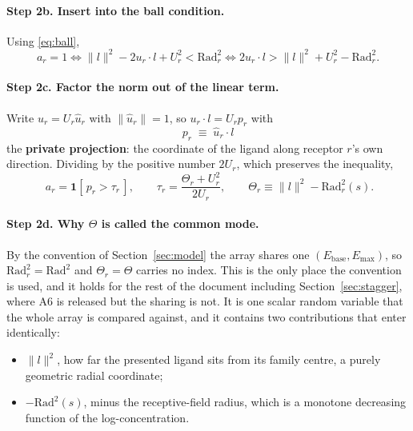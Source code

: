 \documentclass[11pt,a4paper]{article}
\newcommand{\Ebase}{E_{\mathrm{base}}}
\newcommand{\Emax}{E_{\mathrm{max}}}
\newcommand{\uhat}{\hat{u}}
\begin{document}
\paragraph{Step 2b. Insert into the ball condition.} Using \eqref{eq:ball},
\begin{equation}
  a_r = 1
  \iff \|l\|^2 - 2u_r\cdot l + U_r^2 < \mathrm{Rad}_r^2
  \iff 2u_r\cdot l > \|l\|^2 + U_r^2 - \mathrm{Rad}_r^2 .
\end{equation}

\paragraph{Step 2c. Factor the norm out of the linear term.} Write $u_r = U_r\uhat_r$
with $\|\uhat_r\|=1$, so $u_r \cdot l = U_r p_r$ with
\begin{equation}
  p_r \;\equiv\; \uhat_r \cdot l
\end{equation}
the \textbf{private projection}: the coordinate of the ligand along receptor $r$'s own
direction. Dividing by the positive number $2U_r$, which preserves the inequality,
\begin{equation}
  \boxed{\;a_r = \mathbf{1}\!\left[\,p_r > \tau_r\,\right],
  \qquad
  \tau_r = \frac{\Theta_r + U_r^2}{2U_r},
  \qquad
  \Theta_r \equiv \|l\|^2 - \mathrm{Rad}_r^2(s) . }
  \label{eq:Theta}
\end{equation}

\paragraph{Step 2d. Why $\Theta$ is called the common mode.} By the convention of
Section~\ref{sec:model} the array shares one $(\Ebase,\Emax)$, so
$\mathrm{Rad}_r^2=\mathrm{Rad}^2$ and $\Theta_r=\Theta$ carries no index. This is the
only place the convention is used, and it holds for the rest of the document including
Section~\ref{sec:stagger}, where A6 is released but the sharing is not. It is one scalar random variable that the whole array is compared
against, and it contains two contributions that enter identically:
\begin{itemize}
  \item $\|l\|^2$, how far the presented ligand sits from its family centre, a purely
    geometric radial coordinate;
  \item $-\mathrm{Rad}^2(s)$, minus the receptive-field radius, which is a monotone
    decreasing function of the log-concentration.
\end{itemize}
\end{document}
